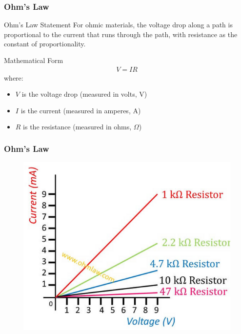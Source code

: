 \documentclass{beamer}
\begin{document}
\begin{frame}
\frametitle{Ohm's Law}
\begin{block}{Ohm's Law Statement}
For ohmic materials, the voltage drop along a path is proportional to the current that runs through the path, with resistance as the constant of proportionality.
\end{block}

\begin{block}{Mathematical Form}
\begin{align}
V = IR
\end{align}
where:
\begin{itemize}
\item $V$ is the voltage drop (measured in volts, V)
\item $I$ is the current (measured in amperes, A)
\item $R$ is the resistance (measured in ohms, $\Omega$)
\end{itemize}
\end{block}
\end{frame}

\begin{frame}
\frametitle{Ohm's Law}
\begin{alertblock}{}
\begin{figure}
    \centering
    \includegraphics[width=0.7\linewidth]{phys11-circuits-ohms-law-resistor-graph.png}
\end{figure}
\end{alertblock}
\end{frame}
\end{document}
